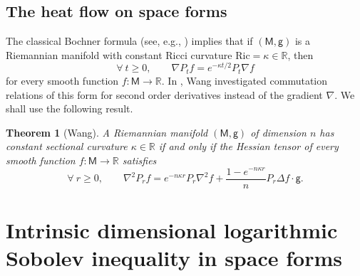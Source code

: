 \documentclass[a4paper,twoside,11pt,reqno]{amsart}
\newtheorem{theorem}{Theorem}
\newcommand{\R}{\mathbb{R}} %
\newcommand{\MM}{\mathsf{M}}
\newcommand{\GG}{\mathsf{g}}
\newcommand{\mr}{\mathrm}
\begin{document}
\subsection{The heat flow on space forms} 
The classical Bochner formula  (see, e.g., \cite{Wan19}) implies that if $(\MM,\GG)$ is a Riemannian manifold with constant Ricci curvature $\mr{Ric} = \kappa\in\R$, then
\begin{equation}
\forall \ t\geq0,\qquad  \nabla P_t f = e^{-\kappa t/2} P_t \nabla f
\end{equation}
for every smooth function $f:\MM\to\R$. In \cite{Wan19}, Wang investigated commutation relations of this form for second order derivatives instead of the gradient $\nabla$. We shall use the following result.

\begin{theorem} [Wang] \label{thm:wang}
A Riemannian manifold $(\MM,\GG)$ of dimension $n$ has constant sectional curvature $\kappa\in\R$ if and only if the Hessian tensor of every smooth function $f:\MM\to\R$ satisfies
\begin{equation} \label{eq:wang}
\forall \ r\geq0, \qquad \nabla^2P_rf = e^{-n\kappa r} P_r\nabla^2f + \frac{1-e^{-n\kappa r}}{n} P_r\Delta f\cdot \GG.
\end{equation}
\end{theorem}


\section{Intrinsic dimensional logarithmic Sobolev inequality in space forms}
\label{sec:LSImanifold}
\end{document}

